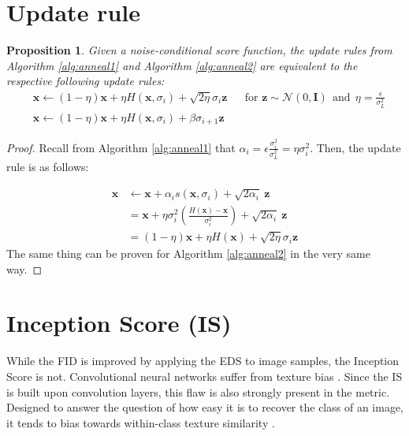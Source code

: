 \documentclass{article} \usepackage{iclr2021_conference_notitle,times}
\theoremstyle{definition}
\theoremstyle{definition}
\newtheorem{proposition}{Proposition}
\begin{document}
\section{Update rule}
\label{app:update_rule_proof}

\begin{proposition}\label{prop:ff}
\em Given a noise-conditional score function, the update rules from Algorithm \ref{alg:anneal1} and Algorithm \ref{alg:anneal2} are equivalent to the respective following update rules: \em 
\begin{align*} &\boldsymbol{x} \gets (1-\eta)\boldsymbol{x} + \eta H(\boldsymbol{x},\sigma_i) + \sqrt{2\eta}\sigma_i \boldsymbol{z}  && \text{for } \boldsymbol{z} \sim \mathcal{N}(0, \boldsymbol{I}) ~~ \text{and} ~~ \eta = \frac{\epsilon}{\sigma_L^2} \\
&\boldsymbol{x} \gets (1-\eta)\boldsymbol{x} + \eta H(\boldsymbol{x},\sigma_i) + \beta \sigma_{i+1} \boldsymbol{z}
\end{align*}
\end{proposition}

\begin{proof}
Recall from Algorithm \ref{alg:anneal1} that $\alpha_i = \epsilon \frac{\sigma_i^2}{\sigma_L^2} = \eta \sigma_i^2$. Then, the update rule is as follows:

\begin{align*}
    \boldsymbol{x} &\gets \boldsymbol{{x}} + \alpha_i s(\boldsymbol{{x}}, \sigma_i) + \sqrt{2 \alpha_i}~ \boldsymbol{z}\\ &= \boldsymbol{{x}} + \eta \sigma_i^2 \left(\frac{H(\boldsymbol{x}) - \boldsymbol{{x}}}{\sigma_i^2}\right)+  \sqrt{2 \alpha_i}~ \boldsymbol{z} \\
    &= (1-\eta)\boldsymbol{{x}} + \eta H(\boldsymbol{x}) + \sqrt{2\eta}\sigma_i \boldsymbol{z}
\end{align*}
The same thing can be proven for Algorithm \ref{alg:anneal2} in the very same way.
\end{proof}

\section{Inception Score (IS)}\label{sec:is}

While the FID is improved by applying the EDS to image samples, the Inception Score is not.
Convolutional neural networks suffer from texture bias \citep{DBLP:journals/corr/abs-1811-12231}. Since the IS is built upon convolution layers, this flaw is also strongly present in the metric. Designed to answer the question of how easy it is to recover the class of an image, it tends to bias towards within-class texture similarity \citep{ISnote}. 
\end{document}

